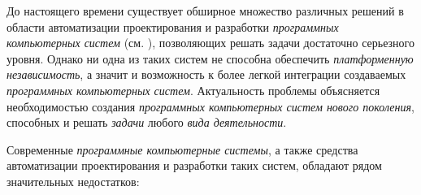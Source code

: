 До настоящего времени существует обширное множество различных решений в области автоматизации проектирования и разработки \textit{программных компьютерных систем} (см. ), позволяющих решать задачи достаточно серьезного уровня. Однако ни одна из таких систем не способна обеспечить \textit{платформенную независимость}, а значит и возможность к более легкой интеграции создаваемых \textit{программных компьютерных систем}. Актуальность проблемы объясняется необходимостью создания \textit{программных компьютерных систем нового поколения}, способных  и  решать \textit{задачи} любого \textit{вида деятельности}.

Современные \textit{программные компьютерные системы}, а также средства автоматизации проектирования и разработки таких систем, обладают рядом значительных недостатков:

